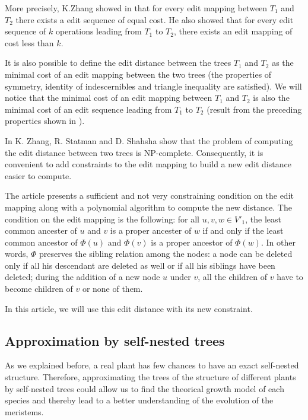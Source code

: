 More precisely, K.Zhang showed in \cite{zhang} that for every edit
mapping between $T_{1}$ and $T_{2}$ there exists a edit sequence of
equal cost. He also showed that for every edit sequence of $k$
operations leading from $T_{1}$ to $T_{2}$, there exists an edit
mapping of cost less than $k$.

It is also possible to define the edit distance between the trees
$T_{1}$ and $T_{2}$ as the minimal cost of an edit mapping between the
two trees (the properties of symmetry, identity of indescernibles and
triangle inequality are satisfied). We will notice that the minimal
cost of an edit mapping between $T_{1}$ and $T_{2}$ is also the
minimal cost of an edit sequence leading from $T_{1}$ to $T_{2}$
(result from the preceding properties shown in \cite{zhang}). 

In \cite{NPCzhang} K. Zhang, R. Statman and D. Shahsha show that the
problem of computing the edit distance between two trees is
NP-complete. Consequently, it is convenient to add constraints to the
edit mapping to build a new edit distance easier to compute.

The article \cite{zhang} presents a sufficient and not very
constraining condition on the edit mapping along with a polynomial
algorithm to compute the new distance. The condition on the edit
mapping is the following: for all $u,v,w \in V'_{1}$, the
least common ancester of $u$ and $v$ is a proper ancester of $w$ if
and only if the least common ancestor of $\Phi(u)$ and $\Phi(v)$ is a
proper ancestor of $\Phi(w)$. In other words, $\Phi$ preserves the
sibling relation among the nodes: a node can be deleted only if all
his descendant are deleted as well or if all his siblings have been
deleted; during the addition of a new node $u$ under $v$, all the
children of $v$ have to become children of $v$ or none of them.

In this article, we will use this edit distance with its new
constraint.

\subsection{Approximation by self-nested trees}

As we explained before, a real plant has few chances to have an exact
self-nested structure. Therefore, approximating the trees of the
structure of different plants by self-nested trees could allow us to
find the theorical growth model of each species and thereby lead to a
better understanding of the evolution of the meristems.


